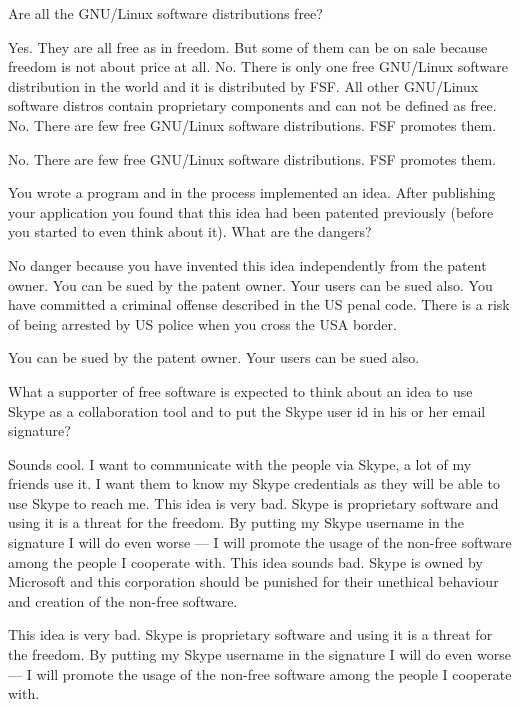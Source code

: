 \begin{question}[type=exam]
Are all the GNU/Linux software distributions free?
\begin{itemize}
\chk Yes. They are all free as in freedom. But some of them can be on sale because freedom is not about price at all.
\chk No. There is only one free GNU/Linux software distribution in the world and it is distributed by FSF. All other GNU/Linux software distros contain proprietary components and can not be defined as free.
\chk No. There are few free GNU/Linux software distributions. FSF promotes them.
\end{itemize}
\end{question}
\begin{solution}
No. There are few free GNU/Linux software distributions. FSF promotes them.
\end{solution}


\begin{question}[type=exam]
You wrote a program and in the process implemented an idea. After publishing your application you found that this idea had been patented previously (before you started to even think about it). What are the dangers?
\begin{itemize}
\chk No danger because you have invented this idea independently from the patent owner.
\chk You can be sued by the patent owner. Your users can be sued also.
\chk You have committed a criminal offense described in the US penal code. There is a risk of being arrested by US police when you cross the USA border.
\end{itemize}
\end{question}
\begin{solution}
You can be sued by the patent owner. Your users can be sued also.
\end{solution}

\begin{question}[type=exam]
What a supporter of free software is expected to think about an idea to use Skype as a collaboration tool and to put the Skype user id in his or her email signature?
\begin{itemize}
\chk Sounds cool. I want to communicate with the people via Skype, a lot of my friends use it. I want them to know my Skype credentials as they will be able to use Skype to reach me.
\chk This idea is very bad. Skype is proprietary software and using it is a threat for the freedom. By putting my Skype username in the signature I will do even worse --- I will promote the usage of the non-free software among the people I cooperate with.
\chk This idea sounds bad. Skype is owned by Microsoft and this corporation should be punished for their unethical behaviour and creation of the non-free software.
\end{itemize}
\end{question}
\begin{solution}
This idea is very bad. Skype is proprietary software and using it is a threat for the freedom. By putting my Skype username in the signature I will do even worse --- I will promote the usage of the non-free software among the people I cooperate with.
\end{solution}

